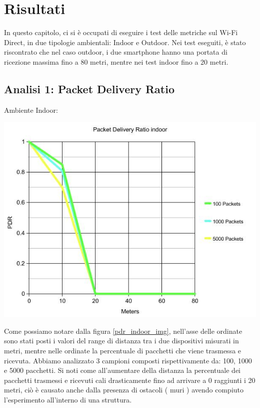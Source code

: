 \chapter{Risultati}
In questo capitolo, ci si è occupati di eseguire i test delle metriche sul Wi-Fi Direct, in due tipologie ambientali: Indoor e Outdoor. 
Nei test eseguiti, è stato riscontrato che nel caso outdoor, i due smartphone hanno una portata di ricezione massima fino a 80 metri, mentre nei test indoor fino a 20 metri.

\section{Analisi 1: Packet Delivery Ratio}

Ambiente Indoor:
\begin{center}
\includegraphics[width=1\textwidth]{imgs/PDR_Indoor_New.jpg}
\label{pdr_indoor_img}%
\end{center}

Come possiamo notare dalla figura \ref{pdr_indoor_img}, nell'asse delle ordinate sono stati posti i valori del range di distanza tra i due dispositivi misurati in metri, mentre nelle ordinate la percentuale di pacchetti che viene trasmessa e ricevuta.
Abbiamo analizzato 3 campioni composti rispettivamente da: 100, 1000 e 5000 pacchetti.
Si noti come all'aumentare della distanza la percentuale dei pacchetti trasmessi e ricevuti cali drasticamente fino ad arrivare a 0 raggiunti i 20 metri, ciò è causato anche dalla presenza di ostacoli ( muri ) avendo compiuto l'esperimento all'interno di una struttura.

